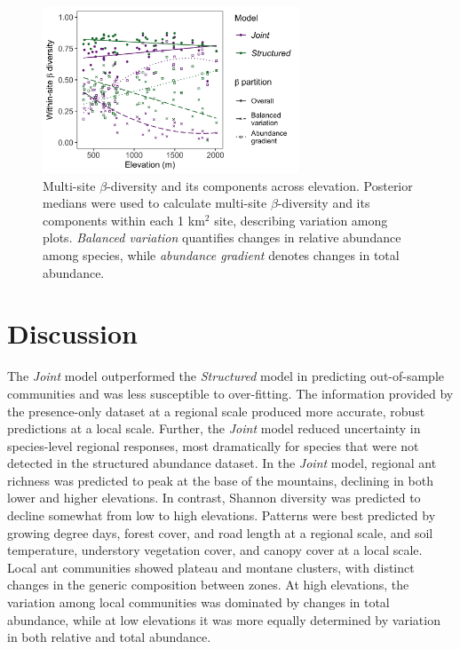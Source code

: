 \documentclass[preprint,final,times,12pt,3p]{elsarticle}
\begin{document}
\begin{figure}
\centering\includegraphics[width=3in]{../../../ms/1_Ecography/1/figs/beta_diversity.png}
\caption{\label{fig:beta_div} Multi-site $\beta$-diversity and its components across elevation. Posterior medians were used to calculate multi-site $\beta$-diversity and its components within each 1 km$^2$ site, describing variation among plots. \emph{Balanced variation} quantifies changes in relative abundance among species, while \emph{abundance gradient} denotes changes in total abundance.}
\end{figure}


 




\section{Discussion}
\label{S:4}

The \emph{Joint} model outperformed the \emph{Structured} model in predicting out-of-sample communities and was less susceptible to over-fitting. The information provided by the presence-only dataset at a regional scale produced more accurate, robust predictions at a local scale. Further, the \emph{Joint} model reduced uncertainty in species-level regional responses, most dramatically for species that were not detected in the structured abundance dataset. In the \emph{Joint} model, regional ant richness was predicted to peak at the base of the mountains, declining in both lower and higher elevations. In contrast, Shannon diversity was predicted to decline somewhat from low to high elevations. Patterns were best predicted by growing degree days, forest cover, and road length at a regional scale, and soil temperature, understory vegetation cover, and canopy cover at a local scale. Local ant communities showed plateau and montane clusters, with distinct changes in the generic composition between zones. At high elevations, the variation among local communities was dominated by changes in total abundance, while at low elevations it was more equally determined by variation in both relative and total abundance.
\end{document}
